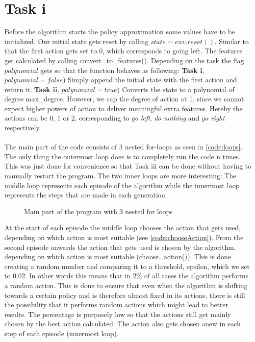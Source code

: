 \documentclass{article}
\begin{document}
	\section{Task i}
	\label{sec:Taski}
	Before the algorithm starts the policy approximation some values have to be initialized. Our initial state gets reset by calling $state = env.reset()$. Similar to that the first action gets set to $0$, which corresponds to going left. The features get calculated by calling convert\_to\_features(). Depending on the task the flag $polynomial$ gets so that the function behaves as following: \textbf{Task i}, $polynomial = false$) Simply append the initial state with the first action and return it. \textbf{Task ii}, $polynomial = true$) Converts the state to a polynomial of degree max\_degree. However, we cap the degree of action at 1, since we cannot expect higher powers of action to deliver meaningful extra features. Hereby the actions can be $0$, $1$ or $2$, corresponding to \textit{go left}, \textit{do nothing} and \textit{go right} respectively.\\
	\\
	The main part of the code consists of 3 nested for-loops as seen in \autoref{code:loops}. The only thing the outermost loop does is to completely run the code n times. This was just done for convenience so that Task iii can be done without having to manually restart the program. The two inner loops are more interesting: The middle loop represents each episode of the algorithm while the innermost loop represents the steps that are made in each generation. 
	
	\begin{figure}
		\caption{Main part of the program with 3 nested for loops}
		\label{code:loops}
		
	\end{figure}
	
	\FloatBarrier
	
	\noindent At the start of each episode the middle loop chooses the action that gets used, depending on which action is most suitable (see \autoref{code:chooseAction}). From the second episode onwards the action that gets used is chosen by the algorithm, depending on which action is most suitable (choose\_action()). This is done creating a random number and comparing it to a threshold, epsilon, which we set to $0.02$. In other words this means that in $2\%$ of all cases the algorithm performs a random action. This is done to ensure that even when the algorithm is shifting towards a certain policy and is therefore almost fixed in its actions, there is still the possibility that it performs random actions which might lead to better results. The percentage is purposely low so that the actions still get mainly chosen by the best action calculated. The action also gets chosen anew in each step of each episode (innermost loop). 
	
\end{document}
